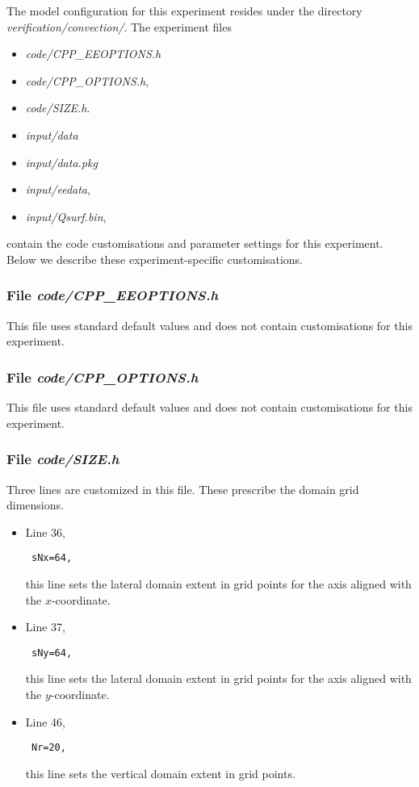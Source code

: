 The model configuration for this experiment resides under the directory
{\it verification/convection/}. The experiment files
\begin{itemize}
\item {\it code/CPP\_EEOPTIONS.h}
\item {\it code/CPP\_OPTIONS.h},
\item {\it code/SIZE.h}. 
\item {\it input/data}
\item {\it input/data.pkg}
\item {\it input/eedata},
\item {\it input/Qsurf.bin},
\end{itemize}
contain the code customisations and parameter settings for this 
experiment. Below we describe these experiment-specific customisations.

\subsubsection{File {\it code/CPP\_EEOPTIONS.h}}
\label{www:tutorials}

This file uses standard default values and does not contain
customisations for this experiment.

\subsubsection{File {\it code/CPP\_OPTIONS.h}}
\label{www:tutorials}

This file uses standard default values and does not contain
customisations for this experiment.

\subsubsection{File {\it code/SIZE.h}}
\label{www:tutorials}

Three lines are customized in this file. These prescribe the domain grid dimensions.
\begin{itemize}

\item Line 36, 
\begin{verbatim} sNx=64, \end{verbatim} this line sets
the lateral domain extent in grid points for the
axis aligned with the $x$-coordinate.

\item Line 37, 
\begin{verbatim} sNy=64, \end{verbatim} this line sets
the lateral domain extent in grid points for the
axis aligned with the $y$-coordinate.

\item Line 46, 
\begin{verbatim} Nr=20,   \end{verbatim} this line sets
the vertical domain extent in grid points.

\end{itemize}

